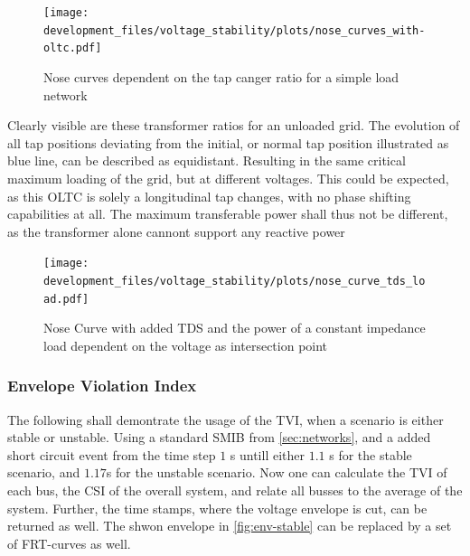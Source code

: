 \begin{figure}[htbp!]
    \centering
    \texttt{[image: development\_files/voltage\_stability/plots/nose\_curves\_with-oltc.pdf]}
    \caption[Nose curves dependent on the tap changer ratio for a simple load network]{Nose curves dependent on the tap canger ratio for a simple load network}
    \label{fig:oltc-nose-curve}
\end{figure}

Clearly visible are these transformer ratios for an unloaded grid.
The evolution of all tap positions deviating from the initial, or normal tap position illustrated as blue line, can be described as equidistant.
Resulting in the same critical maximum loading of the grid, but at different voltages.
This could be expected, as this \acs{OLTC} is solely a longitudinal tap changes, with no phase shifting capabilities at all.
The maximum transferable power shall thus not be different, as the transformer alone cannont support any reactive power


\begin{figure}[htbp!]
    \centering
    \texttt{[image: development\_files/voltage\_stability/plots/nose\_curve\_tds\_load.pdf]}
    \caption{Nose Curve with added \acs{TDS} and the power of a constant impedance load dependent on the voltage as intersection point}
    \label{fig:nc-tds-load}
\end{figure}

\subsubsection{Envelope Violation Index}

The following shall demontrate the usage of the \acf{TVI}, when a scenario is either stable or unstable.
Using a standard \acs{SMIB} from \autoref{sec:networks}, and a added short circuit event from the time step $1$ s untill either $1.1$ s for the stable scenario, and $1.17$s for the unstable scenario.
Now one can calculate the \acs{TVI} of each bus, the \acs{CSI} of the overall system, and relate all busses to the average of the system.
Further, the time stamps, where the voltage envelope is cut, can be returned as well. 
The shwon envelope in \autoref{fig:env-stable} can be replaced by a set of \acs{FRT}-curves as well.

